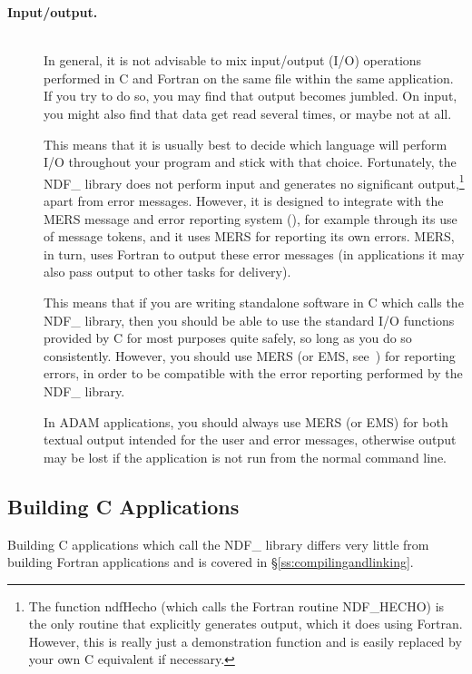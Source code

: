 \begin{description}
\item[{\bf{Input/output.}}]\mbox{}\\
In general, it is not advisable to mix input/output (I/O) operations
performed in C and Fortran on the same file within the same
application.  If you try to do so, you may find that output becomes
jumbled. On input, you might also find that data get read several
times, or maybe not at all.

This means that it is usually best to decide which language will
perform I/O throughout your program and stick with that
choice. Fortunately, the NDF\_ library does not perform input and
generates no significant output,\footnote{The function ndfHecho (which
calls the Fortran routine NDF\_HECHO) is the only routine that
explicitly generates output, which it does using Fortran. However,
this is really just a demonstration function and is easily replaced by
your own C equivalent if necessary.} apart from error
messages. However, it is designed to integrate with the MERS message
and error reporting system (), for example
through its use of message tokens, and it uses MERS for reporting its
own errors. MERS, in turn, uses Fortran to output these error messages
(in  applications it may also pass output to other
tasks for delivery).

This means that if you are writing standalone software in C which
calls the NDF\_ library, then you should be able to use the standard
I/O functions provided by C for most purposes quite safely, so long as
you do so consistently. However, you should use MERS (or EMS,
see~) for reporting errors, in order to be
compatible with the error reporting performed by the NDF\_ library.

In ADAM applications, you should always use MERS (or EMS) for both
textual output intended for the user and error messages, otherwise
output may be lost if the application is not run from the normal
command line.
\end{description}

\subsection{Building C Applications}

Building C applications which call the NDF\_ library differs very
little from building Fortran applications and is covered in
\S\ref{ss:compilingandlinking}.

\newpage
